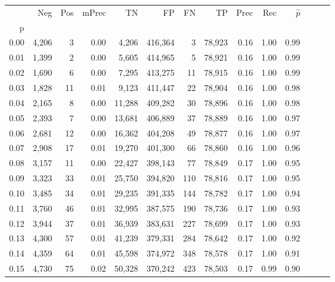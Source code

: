 \begin{tabular}{rrrrrrrrrrrrrr}
\toprule
{} &    Neg &    Pos & mPrec &       TN &       FP &      FN &      TP &  Prec &   Rec & $\hat{p}$ \\
p    &        &        &       &          &          &         &         &       &       &           \\
\midrule
0.00 &  4,206 &      3 &  0.00 &    4,206 &  416,364 &       3 &  78,923 &  0.16 &  1.00 &      0.99 \\
0.01 &  1,399 &      2 &  0.00 &    5,605 &  414,965 &       5 &  78,921 &  0.16 &  1.00 &      0.99 \\
0.02 &  1,690 &      6 &  0.00 &    7,295 &  413,275 &      11 &  78,915 &  0.16 &  1.00 &      0.99 \\
0.03 &  1,828 &     11 &  0.01 &    9,123 &  411,447 &      22 &  78,904 &  0.16 &  1.00 &      0.98 \\
0.04 &  2,165 &      8 &  0.00 &   11,288 &  409,282 &      30 &  78,896 &  0.16 &  1.00 &      0.98 \\
0.05 &  2,393 &      7 &  0.00 &   13,681 &  406,889 &      37 &  78,889 &  0.16 &  1.00 &      0.97 \\
0.06 &  2,681 &     12 &  0.00 &   16,362 &  404,208 &      49 &  78,877 &  0.16 &  1.00 &      0.97 \\
0.07 &  2,908 &     17 &  0.01 &   19,270 &  401,300 &      66 &  78,860 &  0.16 &  1.00 &      0.96 \\
0.08 &  3,157 &     11 &  0.00 &   22,427 &  398,143 &      77 &  78,849 &  0.17 &  1.00 &      0.95 \\
0.09 &  3,323 &     33 &  0.01 &   25,750 &  394,820 &     110 &  78,816 &  0.17 &  1.00 &      0.95 \\
0.10 &  3,485 &     34 &  0.01 &   29,235 &  391,335 &     144 &  78,782 &  0.17 &  1.00 &      0.94 \\
0.11 &  3,760 &     46 &  0.01 &   32,995 &  387,575 &     190 &  78,736 &  0.17 &  1.00 &      0.93 \\
0.12 &  3,944 &     37 &  0.01 &   36,939 &  383,631 &     227 &  78,699 &  0.17 &  1.00 &      0.93 \\
0.13 &  4,300 &     57 &  0.01 &   41,239 &  379,331 &     284 &  78,642 &  0.17 &  1.00 &      0.92 \\
0.14 &  4,359 &     64 &  0.01 &   45,598 &  374,972 &     348 &  78,578 &  0.17 &  1.00 &      0.91 \\
0.15 &  4,730 &     75 &  0.02 &   50,328 &  370,242 &     423 &  78,503 &  0.17 &  0.99 &      0.90 \\

\end{tabular}
